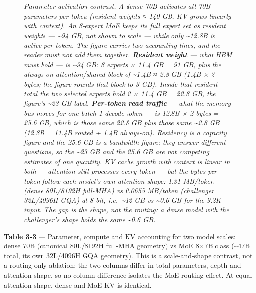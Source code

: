 \begin{figure}
\label{fig:3.4}\emph{Parameter-activation contrast. A dense 70B activates all 70B
parameters per token (resident weights ≈ 140 GB, KV grows linearly with
context). An 8-expert MoE keeps its full expert set as resident weights
--- \textasciitilde94 GB, not shown to scale --- while only
\textasciitilde12.8B is active per token. The figure carries two
accounting lines, and the reader must not add them together.
\textbf{Resident weight} --- what HBM must hold --- is \textasciitilde94
GB: 8 experts × 11.4 GB = 91 GB, plus the always-on attention/shared
block of \textasciitilde1.4B ≈ 2.8 GB (1.4B × 2 bytes; the figure rounds
that block to 3 GB). Inside that resident total the two selected experts
hold 2 × 11.4 GB = 22.8 GB, the figure's \textasciitilde23 GB label.
\textbf{Per-token read traffic} --- what the memory bus moves for one
batch-1 decode token --- is 12.8B × 2 bytes = 25.6 GB, which is those
same 22.8 GB plus those same \textasciitilde2.8 GB (12.8B = 11.4B routed
+ 1.4B always-on). Residency is a capacity figure and the 25.6 GB is a
bandwidth figure; they answer different questions, so the
\textasciitilde23 GB and the 25.6 GB are not competing estimates of one
quantity. KV cache growth with context is linear in both --- attention
still processes every token --- but the bytes per token follow each
model's own attention shape: 1.31 MB/token (dense 80L/8192H full-MHA) vs
0.0655 MB/token (challenger 32L/4096H GQA) at 8-bit,
i.e.~\textasciitilde12 GB vs \textasciitilde0.6 GB for the 9.2K input.
The gap is the shape, not the routing: a dense model with the
challenger's shape holds the same \textasciitilde0.6 GB.}

\end{figure}

\textbf{\hyperref[tab:3.3]{Table 3-3}} --- Parameter, compute and KV accounting for two
model scales: dense 70B (canonical 80L/8192H full-MHA geometry) vs MoE
8×7B class (\textasciitilde47B total, its own 32L/4096H GQA geometry).
This is a scale-and-shape contrast, not a routing-only ablation: the two
columns differ in total parameters, depth and attention shape, so no
column difference isolates the MoE routing effect. At equal attention
shape, dense and MoE KV is identical.


